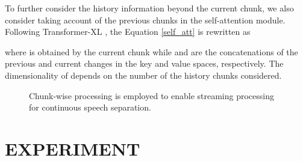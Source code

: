 \documentclass{article}
\begin{document}
	To further consider the history information beyond the current chunk, we also consider taking account of the previous chunks in the self-attention module. Following Transformer-XL \cite{dai2019transformer}, the Equation \ref{self_att} is rewritten as
	
	where  is obtained by the current chunk while  and  are the concatenations of the previous and current changes in the key and value spaces, respectively. The dimensionality of  depends on the number of the history chunks considered. 
	


	\begin{figure}[t]
		\centering
		\caption{Chunk-wise processing is employed to enable streaming processing for continuous speech separation.
		}\label{fig:sliding_window}
		\vspace{-4.5mm}
	\end{figure}
	
	
	\section{EXPERIMENT}
	
\end{document}
